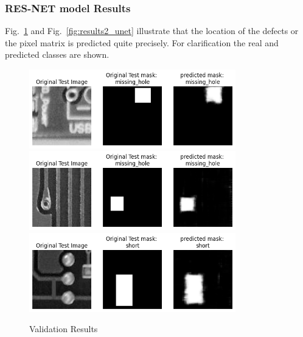 \documentclass[12pt]{article}
\begin{document}
\clearpage

\subsubsection{RES-NET model Results}
Fig.~\ref{fig:results1_unet} and Fig.~\ref{fig:results2_unet} illustrate that the location of the defects or the pixel matrix is predicted quite precisely. For clarification the real and predicted classes are shown.
															  
\begin{figure}[h]
    \centering
    \includegraphics[width=0.8\textwidth]{./graphics/output1.png}
    \includegraphics[width=0.8\textwidth]{./graphics/output2.png}
    \includegraphics[width=0.8\textwidth]{./graphics/output3.png}

    \caption{Validation Results}
    \label{fig:results1_unet}
\end{figure}
\end{document}
